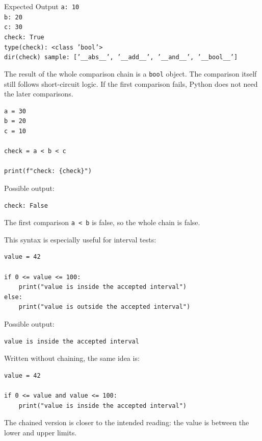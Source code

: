 \begin{iobox}{Expected Output}
\texttt{a: 10} \\
\texttt{b: 20} \\
\texttt{c: 30} \\
\texttt{check: True} \\
\texttt{type(check): <class 'bool'>} \\
\texttt{dir(check) sample: ['\_\_abs\_\_', '\_\_add\_\_', '\_\_and\_\_', '\_\_bool\_\_']} \\
\end{iobox}


The result of the whole comparison chain is a \texttt{bool} object. The comparison itself still follows short-circuit logic. If the first comparison fails, Python does not need the later comparisons.

\begin{verbatim}
a = 30
b = 20
c = 10

check = a < b < c

print(f"check: {check}")
\end{verbatim}

Possible output:

\begin{verbatim}
check: False
\end{verbatim}

The first comparison \texttt{a < b} is false, so the whole chain is false.

This syntax is especially useful for interval tests:

\begin{verbatim}
value = 42

if 0 <= value <= 100:
    print("value is inside the accepted interval")
else:
    print("value is outside the accepted interval")
\end{verbatim}

Possible output:

\begin{verbatim}
value is inside the accepted interval
\end{verbatim}

Written without chaining, the same idea is:

\begin{verbatim}
value = 42

if 0 <= value and value <= 100:
    print("value is inside the accepted interval")
\end{verbatim}

The chained version is closer to the intended reading: the value is between the lower and upper limits.

